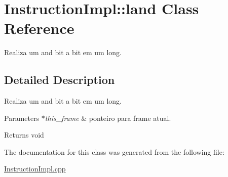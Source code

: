 \hypertarget{class_instruction_impl_1_1land}{}\section{Instruction\+Impl\+:\+:land Class Reference}
\label{class_instruction_impl_1_1land}


Realiza um and bit a bit em um long.  




\subsection{Detailed Description}
Realiza um and bit a bit em um long. 


\begin{DoxyParams}{Parameters}
{\em $\ast$this\+\_\+frame} & ponteiro para frame atual. \\
\hline
\end{DoxyParams}
\begin{DoxyReturn}{Returns}
void 
\end{DoxyReturn}


The documentation for this class was generated from the following file\+:\begin{DoxyCompactItemize}
\item 
\hyperlink{_instruction_impl_8cpp}{Instruction\+Impl.\+cpp}\end{DoxyCompactItemize}
